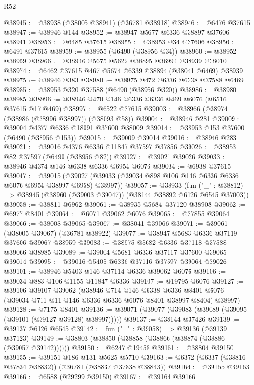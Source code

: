 \begin{lexlean}{R52}
\begin{coremodule}
@38945 := @38938 (@38005 @38941) (@36781 @38918)
@38946 := @6476 @37615
@38947 := @38946 @144
@38952 := @38947 @5677 @6336 @38897 @37606 @38941
@38953 := @6485 @37615
@38955 := @38953 @34 @37606
@38956 := @6491 @37615
@38959 := @38955 (@6490 (@38956 @34))
@38960 := @38952 @38959
@38966 := @38946 @5675 @5622 @38895 @36994 @38939 @38010
@38974 := @6462 @37615 @467 @5674 @6339 @38894 (@38041 @6469) @38939
@38975 := @38946 @383
@38980 := @38975 @472 @6336 @6338 @37588 @6469
@38985 := @38953 @320 @37588 (@6490 (@38956 @320))
@38986 := @38980 @38985
@38996 := @38946 @470 @146 @6336 @6336 @469 @6076 (@6516 @37615 @17 @469)
@38997 := @6522 @37615
@39003 := @38966 (@38974 (@38986 (@38996 @38997)) (@38093 @58))
@39004 := @38946 @281
@39009 := @39004 @4377 @6336 @18091 @37600 @38009
@39014 := @38953 @153 @37600 (@6490 (@38956 @153))
@39015 := @39009 @39014
@39016 := @38946 @283
@39021 := @39016 @4376 @6336 @11847 @37597 @37856
@39026 := @38953 @82 @37597 (@6490 (@38956 @82))
@39027 := @39021 @39026
@39033 := @38946 @4374 @146 @6338 @6336 @6954 @6076
@39034 := @6938 @37615
@39047 := @39015
    (@39027 (@39033 (@39034 @898 @106 @146 @6336 @6336 @6076 @6954 @38997 @6958) @38997))
@39057 := @38933
    (fun ("_" : @38812) => @38945 (@38960 (@39003 @39047)) (@38144 @38892 @6126 @6545 @37003))
@39058 := @38811 @6962
@39061 := @38935 @5684 @37120 @38908
@39062 := @6977 @8401
@39064 := @6071 @39062 @6076
@39065 := @37855 @39064
@39066 := @38008 @39065
@39067 := @38041 @39066
@39071 := @39061 (@38005 @39067) (@36781 @38922)
@39077 := @38947 @5683 @6336 @37119 @37606 @39067 @38959
@39083 := @38975 @5682 @6336 @37118 @37588 @39066 @38985
@39089 := @39004 @5681 @6336 @37117 @37600 @39065 @39014
@39095 := @39016 @5405 @6336 @37116 @37597 @39064 @39026
@39101 := @38946 @5403 @146 @37114 @6336 @39062 @6076
@39106 := @39034 @883 @106 @1155 @11847 @6336
@39107 := @19795 @6076
@39127 := @39106
    @39107
    @39062
    (@38946
      @714
      @146
      @6338
      @6336
      @8401
      @6076
      (@39034 @711 @11 @146 @6336 @6336 @6076 @8401 @38997 @8404)
      @38997)
@39128 := @7175 @8401
@39136 := @39071 (@39077 (@39083 (@39089 (@39095 (@39101 (@39127 @39128) @38997)))))
@39137 := @38144 @37426
@39139 := @39137 @6126 @6545
@39142 := fun ("_" : @39058) => @39136 (@39139 @37123)
@39149 := @38803 (@38850 (@38858 (@38866 (@38874 (@38886 (@39057 @39142))))))
@39150 := @6247 @19458
@39151 := @38804 @39150
@39155 := @39151 @186 @131 @5625 @5710
@39163 := @6372 (@6337 (@38816 @37834 @38832)) (@36781 (@38837 @37838 @38843))
@39164 := @39155 @39163
@39166 := @6588 (@29299 @39150)
@39167 := @39164 @39166

\end{coremodule}
\end{lexlean}
